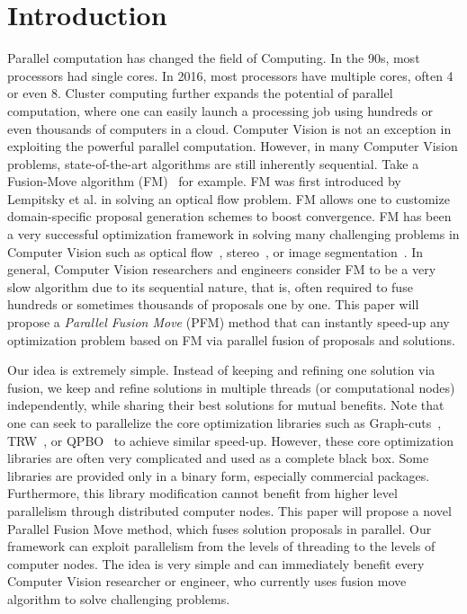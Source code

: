 \section{Introduction}
Parallel computation has changed the field of Computing.  In the 90s,
most processors had single cores. In 2016, most processors have
multiple cores, often 4 or even 8. Cluster computing further expands
the potential of parallel computation, where one can easily launch a
processing job using hundreds or even thousands of computers in a
cloud. Computer Vision is not an exception in exploiting the powerful
parallel computation. However, in many Computer Vision problems,
state-of-the-art algorithms are still inherently sequential. Take a
Fusion-Move algorithm (FM)~\cite{viktor,second_order_stereo,else} for
example. FM was first introduced by Lempitsky et al. in solving an
optical flow problem. FM allows one to customize domain-specific
proposal generation schemes to boost convergence. FM has been a very
successful optimization framework in solving many challenging problems
in Computer Vision such as optical flow~\cite{viktor},
stereo~\cite{second_order_stereo}, or image segmentation~\cite{some}.
In general, Computer Vision researchers and engineers consider FM to
be a very slow algorithm due to its sequential nature, that is, often
required to fuse hundreds or sometimes thousands of proposals one by
one. This paper will propose a {\it Parallel Fusion Move} (PFM) method
that can instantly speed-up any optimization problem based on FM via
parallel fusion of proposals and solutions.

Our idea is extremely simple. Instead of keeping and refining one
solution via fusion, we keep and refine solutions in multiple threads
(or computational nodes) independently, while sharing their best
solutions for mutual benefits. Note that one can seek to parallelize
the core optimization libraries such as Graph-cuts~\cite{},
TRW~\cite{kolmogorov}, or QPBO~\cite{} to achieve similar
speed-up. However, these core optimization libraries are often very
complicated and used as a complete black box. Some libraries are
provided only in a binary form, especially commercial
packages. Furthermore, this library modification cannot benefit from
higher level parallelism through distributed computer nodes.
 This paper will propose a novel
Parallel Fusion Move method, which fuses solution proposals in
parallel. Our framework can exploit parallelism from the levels of
threading to the levels of computer nodes. The idea is very simple and
can immediately benefit every Computer Vision researcher or engineer,
who currently uses fusion move algorithm to solve challenging
problems. 

